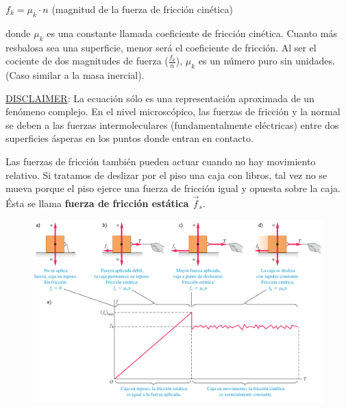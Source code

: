 \documentclass{article}
\newcommand{\bl}[1]{\textbf{#1}}
\newcommand{\definicion}[1]{%
    \vspace{0.5cm}
    \begin{definicionbox}
        #1
    \end{definicionbox}
    \vspace{0.5cm}
}
\begin{document}
    \definicion{
        \centering
        \par \( f_k = \mu_k \cdot n \) \quad \quad \quad (magnitud de la fuerza de fricción cinética)
    }

    \par donde $\mu_k$ es una constante llamada coeficiente de fricción cinética. Cuanto más resbalosa sea una superficie, menor será el coeficiente de fricción. Al ser el cociente de dos magnitudes de fuerza ($\frac{{f}_k}{{n}}$), $\mu_k$ es un número puro sin unidades. (Caso similar a la masa inercial).

    \vspace{0.5cm}

    \par \color{red} \underline{DISCLAIMER}: \color{black} La ecuación sólo es una representación aproximada de un fenómeno complejo. En el nivel microscópico, las fuerzas de fricción y la normal se deben a las fuerzas intermoleculares (fundamentalmente eléctricas) entre dos superficies ásperas en los puntos donde entran en contacto.

    \vspace{0.5cm}

    \par Las fuerzas de fricción también pueden actuar cuando no hay movimiento relativo. Si tratamos de deslizar por el piso una caja con libros, tal vez no se mueva porque el piso ejerce una fuerza de fricción igual y opuesta sobre la caja. Ésta se llama \bl{fuerza de fricción estática $\vec{f}_s$}.

    \begin{figure}[H]
        \centering
        \includegraphics[width=\textwidth]{img/3.3-2.png}
    \end{figure}
\end{document}
